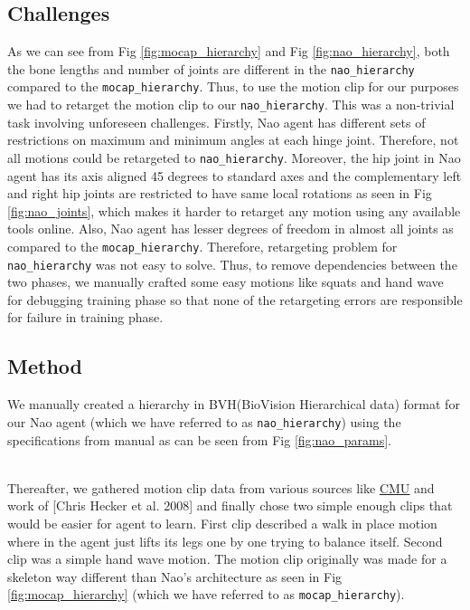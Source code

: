	\subsection{Challenges}
	As we can see from Fig \ref{fig:mocap_hierarchy} and Fig \ref{fig:nao_hierarchy}, both the bone lengths and number of joints are different in the \texttt{nao\_hierarchy} compared to the \texttt{mocap\_hierarchy}. Thus, to use the motion clip for our purposes we had to retarget the motion clip to our \texttt{nao\_hierarchy}. This was a non-trivial task involving unforeseen challenges. 
	Firstly, Nao agent has different sets of restrictions on maximum and minimum angles at each hinge joint. Therefore, not all motions could be retargeted to \texttt{nao\_hierarchy}. Moreover, the hip joint in Nao agent has its axis aligned 45 degrees to standard axes and the complementary left and right hip joints are restricted to have same local rotations as seen in Fig \ref{fig:nao_joints}, which makes it harder to retarget any motion using any available tools online. Also, Nao agent has lesser degrees of freedom in almost all joints as compared to the \texttt{mocap\_hierarchy}. Therefore, retargeting problem for \texttt{nao\_hierarchy} was not easy to solve. Thus, to remove dependencies between the two phases, we manually crafted some easy motions like squats and hand wave for debugging training phase so that none of the retargeting errors are responsible for failure in training phase.

	\subsection{Method}
	We manually created a hierarchy in BVH(BioVision Hierarchical data) \cite{Maddock_motioncapture} format  for our Nao \cite{usermanual} agent (which we have referred to as \texttt{nao\_hierarchy}) using the specifications from manual as can be seen from Fig \ref{fig:nao_params}. 

	\\
	Thereafter, we gathered motion clip data from various sources like \href{http://mocap.cs.cmu.edu}{CMU} and work of [Chris Hecker et al. 2008]\cite{sporeanim} and finally chose two simple enough clips that would be easier for agent to learn. First clip described a walk in place motion where in the agent just lifts its legs one by one trying to balance itself. Second clip was a simple hand wave motion. The motion clip originally was made for a skeleton way different than Nao's architecture as seen in Fig \ref{fig:mocap_hierarchy} (which we have referred to as \texttt{mocap\_hierarchy}).
	
